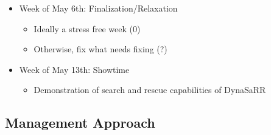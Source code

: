 \documentclass[12pt]{article}
\begin{document}
\begin{itemize}
\item Week of May 6th: Finalization/Relaxation
\begin{itemize}
\item Ideally a stress free week (0)
\item Otherwise, fix what needs fixing (?)
\end{itemize}
\end{itemize}
\begin{itemize}
\item Week of May 13th: Showtime  
\begin{itemize}
\item Demonstration of search and rescue capabilities of DynaSaRR
\end{itemize}
\end{itemize}

\subsection{Management Approach}
\end{document}

